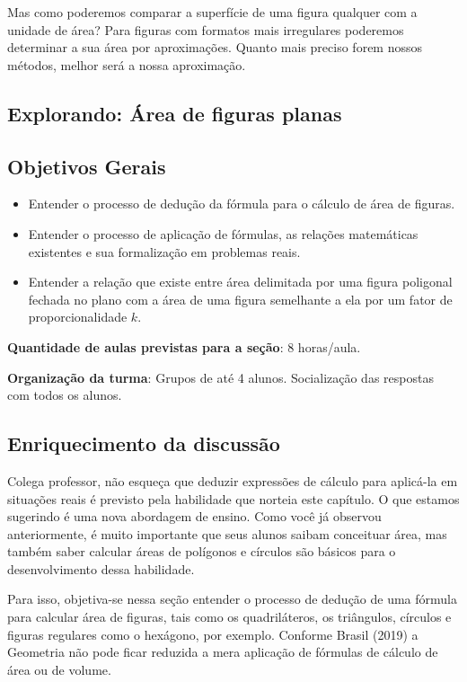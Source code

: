 Mas como poderemos comparar a superfície de uma figura qualquer com a unidade de área? Para figuras com formatos mais irregulares poderemos determinar a sua área por aproximações. Quanto mais preciso forem nossos métodos, melhor será a nossa aproximação.

\begin{paginatexto}
\section{Explorando: Área de figuras planas}

\subsection{Objetivos Gerais}
\begin{itemize}
\item Entender o processo de dedução da fórmula para o cálculo de área de figuras.
\item Entender o processo de aplicação de fórmulas, as relações matemáticas existentes e sua formalização em problemas reais.
\item Entender a relação que existe entre área delimitada por uma figura poligonal fechada no plano com a área de uma figura semelhante a ela por um fator de proporcionalidade $k$. 
\end{itemize}

\textbf{Quantidade de aulas previstas para a seção}: 8 horas/aula.

\textbf{Organização da turma}: Grupos de até 4 alunos. Socialização das respostas com todos os alunos.

\subsection{Enriquecimento da discussão}

Colega professor, não esqueça que deduzir expressões de cálculo para aplicá-la em situações reais é previsto pela habilidade que norteia este capítulo. O que estamos sugerindo é uma nova abordagem de ensino. Como você já observou anteriormente, é muito importante que seus alunos saibam conceituar área, mas também saber calcular áreas de polígonos e círculos são básicos para o desenvolvimento dessa habilidade.

Para isso, objetiva-se nessa seção entender o processo de dedução de uma fórmula para calcular área de figuras, tais como os quadriláteros, os triângulos, círculos e figuras regulares como o hexágono, por exemplo. Conforme Brasil (2019) a Geometria não pode ficar reduzida a mera aplicação de fórmulas de cálculo de área ou de volume.


\end{paginatexto}
